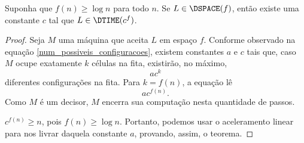 \begin{theorem}
    Suponha que $f(n) \geq \log n$ para todo $n$.
    Se $L \in \DSPACE(f)$,
    então existe uma constante $c$
    tal que $L \in \DTIME(c^f)$.
\end{theorem}

\begin{proof}
    Seja $M$ uma máquina que aceita $L$ em espaço $f$.
    Conforme observado na equação \ref{num_possiveis_configuracoes},
    existem constantes $a$ e $c$ tais que,
    caso $M$ ocupe exatamente $k$ células na fita,
    existirão, no máximo,
    \begin{equation*}
        ac^k
    \end{equation*}
    diferentes configurações na fita.
    Para $k = f(n)$, a equação lê
    \begin{equation*}
        ac^{f(n)}.
    \end{equation*}
    Como $M$ é um decisor,
    $M$ encerra sua computação nesta quantidade de passos.

    $c^{f(n)} \geq n$, pois $f(n) \geq \log n$.
    Portanto, podemos usar o aceleramento linear
    para nos livrar daquela constante $a$,
    provando, assim, o teorema.
\end{proof}
